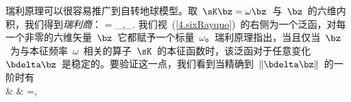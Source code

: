 瑞利原理可以很容易推广到自转地球模型。取~$\sK\bz=\omega\bz$~与~$\bz$~的六维内积，我们得到{\em 瑞利商\/}：
%
\eq
\label{4.sixRayquo}
\omega=\frac{\langle_{\!}\langle\bz,\sK\bz\rangle_{\!}\rangle}
{\langle_{\!}\langle\bz,\bz\rangle_{\!}\rangle}.
\en
我们视~(\ref{4.sixRayquo})~的右侧为一个泛函，对每一个非零的六维矢量~$\bz$~它都赋予一个标量~$\omega$。瑞利原理指出，当且仅当~$\bz$~为与本征频率~$\omega$~相关的算子~$\sK$~的本征函数时，该泛函对于任意变化~$\bdelta\bz$~是稳定的。要验证这一点，我们看到当精确到~$\|\bdelta\bz\|$~的一阶时有
\eqa
\label{4.deltaom}
\lefteqn{\delta\omega=\frac{\langle_{\!}\langle\bdelta\bz,\sK\bz\rangle_{\!}\rangle
+\langle_{\!}\langle\bz,\sK\bdelta\bz\rangle_{\!}\rangle
-\omega\langle_{\!}\langle\bdelta\bz,\bz\rangle_{\!}\rangle
-\omega\langle_{\!}\langle\bz,\bdelta\bz\rangle_{\!}\rangle}
{\langle_{\!}\langle\bz,\bz\rangle_{\!}\rangle}} \nonumber \\
& & \mbox{}\hspace{-2.9 mm}=,
\ena
